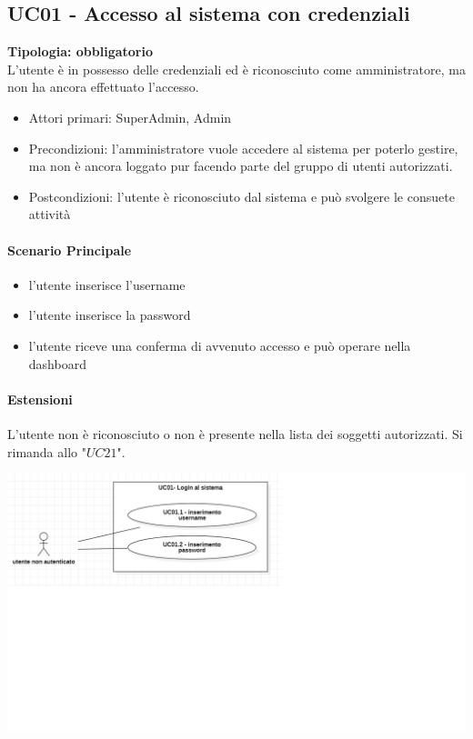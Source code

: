 \documentclass[12pt]{article}
\begin{document}
\subsection{UC01 - Accesso al sistema con credenziali}
\textbf{Tipologia: obbligatorio} \\
L'utente è in possesso delle credenziali ed è riconosciuto come amministratore, ma non ha ancora effettuato l'accesso.
\begin{itemize}
	\item Attori primari: SuperAdmin, Admin
	\item Precondizioni: l'amministratore vuole accedere al sistema per poterlo gestire, ma non è ancora loggato pur facendo parte del gruppo di utenti autorizzati.
	\item Postcondizioni: l'utente è riconosciuto dal sistema e può svolgere le consuete attività
\end{itemize}
\paragraph{Scenario Principale}
\begin{itemize}
	\item l'utente inserisce l'username
	\item l'utente inserisce la password
	\item l'utente riceve una conferma di avvenuto accesso e può operare nella dashboard
\end{itemize}
\paragraph{Estensioni} L'utente non è riconosciuto o non è presente nella lista dei soggetti autorizzati. Si rimanda allo "$UC21 $".

\includegraphics[scale=0.4]{UC01.png}
\end{document}
